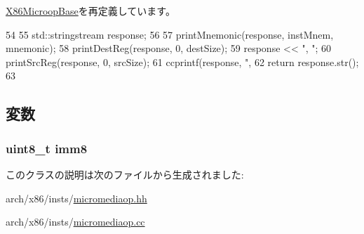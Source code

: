 \hyperlink{classX86ISA_1_1X86MicroopBase_a95d323a22a5f07e14d6b4c9385a91896}{X86MicroopBase}を再定義しています。


\begin{DoxyCode}
54     {
55         std::stringstream response;
56 
57         printMnemonic(response, instMnem, mnemonic);
58         printDestReg(response, 0, destSize);
59         response << ", ";
60         printSrcReg(response, 0, srcSize);
61         ccprintf(response, ", %
62         return response.str();
63     }
\end{DoxyCode}


\subsection{変数}
\hypertarget{classX86ISA_1_1MediaOpImm_ad18c4c3d19022c71370c8724fc285c8f}{
\subsubsection[{imm8}]{\setlength{\rightskip}{0pt plus 5cm}uint8\_\-t {\bf imm8}}}
\label{classX86ISA_1_1MediaOpImm_ad18c4c3d19022c71370c8724fc285c8f}


このクラスの説明は次のファイルから生成されました:\begin{DoxyCompactItemize}
\item 
arch/x86/insts/\hyperlink{micromediaop_8hh}{micromediaop.hh}\item 
arch/x86/insts/\hyperlink{micromediaop_8cc}{micromediaop.cc}\end{DoxyCompactItemize}
